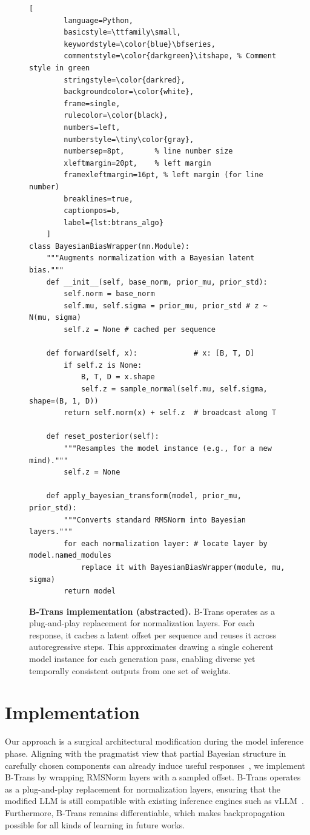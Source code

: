 \documentclass[11pt]{article}
\begin{document}
\begin{figure}[ht]
    \centering
        \begin{lstlisting}[
        language=Python,
        basicstyle=\ttfamily\small,
        keywordstyle=\color{blue}\bfseries,
        commentstyle=\color{darkgreen}\itshape, % Comment style in green
        stringstyle=\color{darkred},
        backgroundcolor=\color{white},
        frame=single,
        rulecolor=\color{black},
        numbers=left,
        numberstyle=\tiny\color{gray},
        numbersep=8pt,       % line number size
        xleftmargin=20pt,    % left margin
        framexleftmargin=16pt, % left margin (for line number)
        breaklines=true,
        captionpos=b,
        label={lst:btrans_algo}
    ]
class BayesianBiasWrapper(nn.Module):
    """Augments normalization with a Bayesian latent bias."""
    def __init__(self, base_norm, prior_mu, prior_std):
        self.norm = base_norm
        self.mu, self.sigma = prior_mu, prior_std # z ~ N(mu, sigma)
        self.z = None # cached per sequence

    def forward(self, x):             # x: [B, T, D]
        if self.z is None:
            B, T, D = x.shape
            self.z = sample_normal(self.mu, self.sigma, shape=(B, 1, D))
        return self.norm(x) + self.z  # broadcast along T
        
    def reset_posterior(self):
        """Resamples the model instance (e.g., for a new mind)."""
        self.z = None

    def apply_bayesian_transform(model, prior_mu, prior_std):
        """Converts standard RMSNorm into Bayesian layers."""
        for each normalization layer: # locate layer by model.named_modules
            replace it with BayesianBiasWrapper(module, mu, sigma)
        return model
    \end{lstlisting}
    \vspace{-10pt}
    \caption{\textbf{B-Trans implementation (abstracted).} B-Trans operates as a plug-and-play replacement for normalization layers. For each response, it caches a latent offset per sequence and reuses it across autoregressive steps. This approximates drawing a single coherent model instance for each generation pass, enabling diverse yet temporally consistent outputs from one set of weights.}
    \label{fig:algorithm_code}
\end{figure}

\section{Implementation}
\label{sec:implementation}
Our approach is a surgical architectural modification during the model inference phase. 
Aligning with the pragmatist view that partial Bayesian structure in carefully chosen components can already induce useful responses~\citep{kristiadi2020being}, we implement B-Trans by wrapping RMSNorm layers with a sampled offset. 
B-Trans operates as a plug-and-play replacement for normalization layers, ensuring that the modified LLM is still compatible with existing inference engines such as vLLM~\cite{kwon2023efficient}. Furthermore, B-Trans remains differentiable, which makes backpropagation possible for all kinds of learning in future works. 
\end{document}
